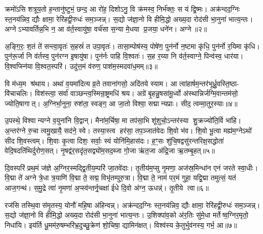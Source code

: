 क्रमो॑ऽसि शत्रूय॒तो ह॒न्तानु॑ष्टुभं॒ छन्द॒ आ रो॑ह॒ दिशोऽनु॒ वि क्र॑मस्व॒ निर्भ॑क्तः॒ स यं द्वि॒ष्मः। अक्र॑न्दद॒ग्निः स्त॒नय॑न्निव॒ द्यौः क्षामा॒ रेरि॑हद्वी॒रुधः॑ सम॒ञ्जन्न्। स॒द्यो ज॑ज्ञा॒नो वि हीमि॒द्धो अख्य॒दा रोद॑सी भा॒नुना॑ भात्य॒न्तः। अग्नेऽभ्यावर्तिन्न॒भि न॒ आ व॑र्त॒स्वायु॑षा॒ वर्च॑सा स॒न्या मे॒धया प्र॒जया॒ धने॑न। अग्ने॥२॥

अ॒ङ्गि॒रः॒ श॒तं ते॑ सन्त्वा॒वृतः॑ स॒हस्रं॑ त उपा॒वृतः॑। तासा॒म्पोष॑स्य॒ पोषे॑ण॒ पुन॑र्नो न॒ष्टमा कृ॑धि॒ पुन॑र्नो र॒यिमा कृ॑धि। पुन॑रू॒र्जा नि व॑र्तस्व॒ पुन॑रग्न इ॒षायु॑षा। पुन॑र्नः पाहि वि॒श्वतः॑। स॒ह र॒य्या नि व॑र्त॒स्वाग्ने॒ पिन्व॑स्व॒ धार॑या। वि॒श्वप्स्नि॑या वि॒श्वत॒स्परि॑। उदु॑त्त॒मं व॑रुण॒ पाश॑म॒स्मदवा॑ध॒मम्॥३॥

वि म॑ध्य॒म श्र॑थाय। अथा॑ व॒यमा॑दित्य व्र॒ते तवाना॑गसो॒ अदि॑तये स्याम। आ त्वा॑हार्\mbox{}षम॒न्तर॑भूर्ध्रु॒वस्ति॒ष्ठा- वि॑चाचलिः। विश॑स्त्वा॒ सर्वा॑ वाञ्छन्त्व॒स्मिन्रा॒ष्ट्रमधि॑ श्रय। अग्रे॑ बृ॒हन्नु॒षसा॑मू॒र्ध्वो अ॑स्थान्निर्जग्मि॒वान्तम॑सो॒ ज्योति॒षागात्। अ॒ग्निर्भा॒नुना॒ रुश॑ता॒ स्वङ्ग॒ आ जा॒तो विश्वा॒ सद्मान्यप्राः। सीद॒ त्वम्मा॒तुर॒स्याः॥४॥

उ॒पस्थे॒ विश्वान्यग्ने व॒युना॑नि वि॒द्वान्। मैना॑म॒र्चिषा॒ मा तप॑सा॒भि शू॑शुचो॒ऽन्तर॑स्या शु॒क्रज्यो॑ति॒र्वि भा॑हि। अ॒न्तर॑ग्ने रु॒चा त्वमु॒खायै॒ सद॑ने॒ स्वे। तस्या॒स्त्व हर॑सा॒ तप॒ञ्जात॑वेदः शि॒वो भ॑व। शि॒वो भू॒त्वा मह्य॑म॒ग्नेऽथो॑ सीद शि॒वस्त्वम्। शि॒वाः कृ॒त्वा दिशः॒ सर्वाः॒ स्वं योनि॑मि॒हास॑दः। ह॒ꣳ॒सः शु॑चि॒षद्वसु॑रन्तरिक्ष॒सद्धोता॑ वेदि॒षदति॑थिर्दुरोण॒सत्। नृ॒षद्व॑र॒सदृ॑त॒सद्व्यो॑म॒सद॒ब्जा गो॒जा ऋ॑त॒जा अ॑द्रि॒जा ऋ॒तम्बृ॒हत्॥५॥

{\anuvakamend[{दिव॒मनु॒ वि क्र॑मस्व॒ निर्भ॑क्तः॒ स यन्द्वि॒ष्मो विष्णो॒र्धने॒नाग्ने॑ऽध॒मम॒स्याः शु॑चि॒षथ्षोड॑श च॥१॥}]}

दि॒वस्परि॑ प्रथ॒मं ज॑ज्ञे अ॒ग्निर॒स्मद्द्वि॒तीय॒म्परि॑ जा॒तवे॑दाः। तृ॒तीय॑म॒प्सु नृ॒मणा॒ अज॑स्र॒मिन्धा॑न एनं जरते स्वा॒धीः। वि॒द्मा ते॑ अग्ने त्रे॒धा त्र॒याणि॑ वि॒द्मा ते॒ सद्म॒ विभृ॑तम्पुरु॒त्रा। वि॒द्मा ते॒ नाम॑ पर॒मं गुहा॒ यद्वि॒द्मा तमुत्सं॒ यत॑ आज॒गन्थ॑। स॒मु॒द्रे त्वा॑ नृ॒मणा॑ अ॒प्स्व॑न्तर्नृ॒चक्षा॑ ईधे दि॒वो अ॑ग्न॒ ऊधन्न्॑। तृ॒तीये त्वा॥६॥

रज॑सि तस्थि॒वास॑मृ॒तस्य॒ योनौ॑ महि॒षा अ॑हिन्वन्न्। अक्र॑न्दद॒ग्निः स्त॒नय॑न्निव॒ द्यौः क्षामा॒ रेरि॑हद्वी॒रुधः॑ सम॒ञ्जन्न्। स॒द्यो ज॑ज्ञा॒नो वि हीमि॒द्धो अख्य॒दा रोद॑सी भा॒नुना॑ भात्य॒न्तः। उ॒शिक्पा॑व॒को अ॑र॒तिः सु॑मे॒धा मर्तेष्व॒ग्निर॒मृतो॒ निधा॑यि। इय॑र्ति धू॒मम॑रु॒षम्भरि॑भ्र॒दुच्छु॒क्रेण॑ शो॒चिषा॒ द्यामिन॑क्षत्। विश्व॑स्य के॒तुर्भुव॑नस्य॒ गर्भ॒ आ॥७॥

